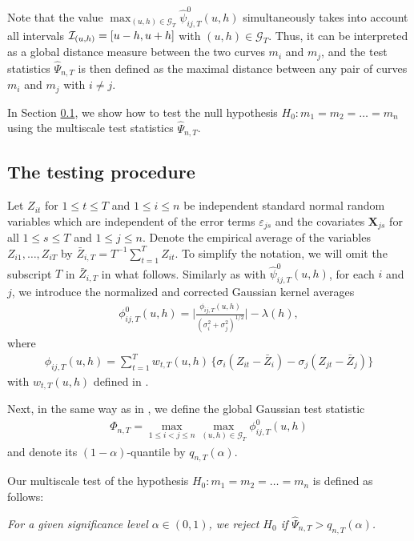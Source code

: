 \documentclass[a4paper,12pt]{article}
\makeatletter
\renewcommand{\eqref}[1]{\tagform@{\ref{#1}}}
\makeatother
\begin{document}
Note that the value $\max_{(u,h) \in \mathcal{G}_T} \hat{\psi}^0_{ij,T}(u, h)$ simultaneously takes into account all intervals $\mathcal{I}_{(u, h)} = [u- h, u+h]$ with $(u,h) \in \mathcal{G}_T$. Thus, it can be interpreted as a global distance measure between the two curves $m_i$ and $m_j$, and the test statistics $\widehat{\Psi}_{n,T}$ is then defined as the maximal distance between any pair of curves $m_i$ and $m_j$ with $i \ne j$.

In Section \ref{subsec:test:test}, we show how to test the null hypothesis $H_0: m_1 =m_2 = \ldots = m_n$ using the multiscale test statistics $\widehat{\Psi}_{n,T}$.

\subsection{The testing procedure}\label{subsec:test:test}


Let $Z_{it}$ for $1 \le t \le T$ and $1 \le i \le n$ be independent standard normal random variables which are independent of the error terms $\varepsilon_{js}$ and the covariates $\mathbf{X}_{js}$ for all $1 \leq s \leq T $ and $1 \leq j \leq n$. Denote the empirical average of the variables $Z_{i1},\ldots,Z_{iT}$ by $\bar{Z}_{i,T} = T^{-1} \sum_{t=1}^T Z_{it}$. To simplify the notation, we will omit the subscript $T$ in $\bar{Z}_{i,T}$ in what follows. Similarly as with $\hat{\psi}^0_{ij,T}(u, h)$, for each $i$ and $j$, we introduce the normalized and corrected Gaussian kernel averages 
\begin{align}\label{eq:phi_zero_ij}
\phi^0_{ij,T}(u, h) =  \bigg|\frac{\phi_{ij,T}(u,h)}{(\sigma_i^2 + \sigma_j^2)^{1/2}}\bigg| - \lambda(h),
\end{align}
where 
\begin{align}\label{eq:phi_ij}
\phi_{ij,T}(u,h) = \sum\nolimits_{t=1}^T w_{t,T}(u,h) \, \big\{ \sigma_i (Z_{it} - \bar{Z}_i) - \sigma_j (Z_{jt} - \bar{Z}_j) \big\}
\end{align}
with $w_{t, T}(u, h)$ defined in \eqref{eq:weights}. 

Next, in the same way as in \eqref{eq:Psi_hat}, we define the global Gaussian test statistic
\begin{align}\label{eq:Phi}
\Phi_{n,T} = \max_{1 \le i < j \le n}\max_{(u,h) \in \mathcal{G}_T} \phi^0_{ij,T}(u, h)
\end{align}
and denote its $(1-\alpha)$-quantile by $q_{n,T}(\alpha)$.

Our multiscale test of the hypothesis $H_0: m_1 = m_2 = \ldots = m_n$ is defined as follows: 
\begin{center}
\begin{minipage}[c][0.75cm][c]{13cm}
\textit{For a given significance level $\alpha \in (0,1)$, we reject $H_0$ if $\widehat{\Psi}_{n,T} > q_{n,T}(\alpha)$.}
\end{minipage}
\end{center}
\end{document}
